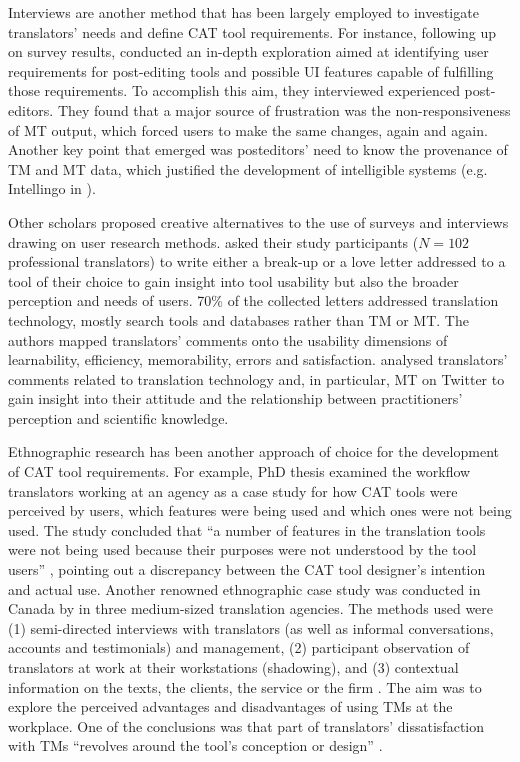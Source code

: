 Interviews are another method that has been largely employed to investigate translators’ needs and define CAT tool requirements. For instance, following up on survey results, \citet{moorkens2017assessing} conducted an in-depth exploration aimed at identifying user requirements for post-editing tools and possible UI features capable of fulfilling those requirements. To accomplish this aim, they interviewed experienced post-editors. They found that a major source of frustration was the non-responsiveness of MT output, which forced users to make the same changes, again and again. Another key point that emerged was posteditors’ need to know the provenance of TM and MT data, which justified the development of intelligible systems (e.g. Intellingo in \cite{coppers2018intellingo}).

Other scholars proposed creative alternatives to the use of surveys and interviews drawing on user research methods. \citet{koskinen2017love} asked their study participants ($N=102$ professional translators) to write either a break-up or a love letter addressed to a tool of their choice to gain insight into tool usability but also the broader perception and needs of users. 70\% of the collected letters addressed translation technology, mostly search tools and databases rather than TM or MT. The authors mapped translators’ comments onto the usability dimensions of learnability, efficiency, memorability, errors and satisfaction. \citet{laubli2017google} analysed translators’ comments related to translation technology and, in particular, MT on Twitter to gain insight into their attitude and the relationship between practitioners’ perception and scientific knowledge.

Ethnographic research has been another approach of choice for the development of CAT tool requirements. For example,  PhD thesis examined the workflow translators working at an agency as a case study for how CAT tools were perceived by users, which features were being used and which ones were not being used. The study concluded that ``a number of features in the translation tools were not being used because their purposes were not understood by the tool users'' \citep[138]{asare2011ethnographic}, pointing out a discrepancy between the CAT tool designer’s intention and actual use. Another renowned ethnographic case study was conducted in Canada by \citet{leblanc2013translators} in three medium-sized translation agencies. The methods used were (1) semi-directed interviews with translators (as well as informal conversations, accounts and testimonials) and management, (2) participant observation of translators at work at their workstations (shadowing), and (3) contextual information on the texts, the clients, the service or the firm \citep[3]{leblanc2013translators}. The aim was to explore the perceived advantages and disadvantages of using TMs at the workplace. One of the conclusions was that part of translators’ dissatisfaction with TMs ``revolves around the tool’s conception or design'' \citep[10]{leblanc2013translators}.

